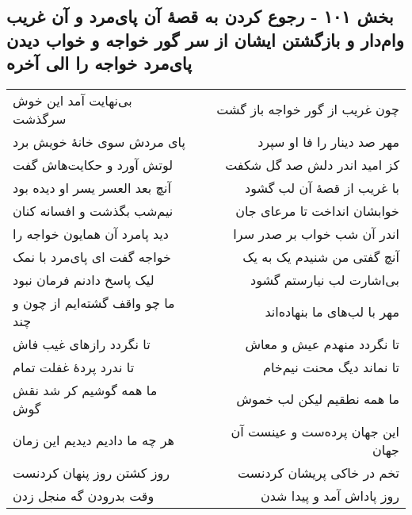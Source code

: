 \begin{center}
\section*{بخش ۱۰۱ - رجوع کردن به قصهٔ آن پای‌مرد و آن غریب وام‌دار و بازگشتن ایشان از سر گور خواجه و خواب دیدن پای‌مرد خواجه را الی آخره}
\label{sec:sh101}
\begin{longtable}{l p{0.5cm} r}
بی‌نهایت آمد این خوش سرگذشت
&&
چون غریب از گور خواجه باز گشت
\\
پای مردش سوی خانهٔ خویش برد
&&
مهر صد دینار را فا او سپرد
\\
لوتش آورد و حکایت‌هاش گفت
&&
کز امید اندر دلش صد گل شکفت
\\
آنچ بعد العسر یسر او دیده بود
&&
با غریب از قصهٔ آن لب گشود
\\
نیم‌شب بگذشت و افسانه کنان
&&
خوابشان انداخت تا مرعای جان
\\
دید پامرد آن همایون خواجه را
&&
اندر آن شب خواب بر صدر سرا
\\
خواجه گفت ای پای‌مرد با نمک
&&
آنچ گفتی من شنیدم یک به یک
\\
لیک پاسخ دادنم فرمان نبود
&&
بی‌اشارت لب نیارستم گشود
\\
ما چو واقف گشته‌ایم از چون و چند
&&
مهر با لب‌های ما بنهاده‌اند
\\
تا نگردد رازهای غیب فاش
&&
تا نگردد منهدم عیش و معاش
\\
تا ندرد پردهٔ غفلت تمام
&&
تا نماند دیگ محنت نیم‌خام
\\
ما همه گوشیم کر شد نقش گوش
&&
ما همه نطقیم لیکن لب خموش
\\
هر چه ما دادیم دیدیم این زمان
&&
این جهان پرده‌ست و عینست آن جهان
\\
روز کشتن روز پنهان کردنست
&&
تخم در خاکی پریشان کردنست
\\
وقت بدرودن گه منجل زدن
&&
روز پاداش آمد و پیدا شدن
\\
\end{longtable}
\end{center}
